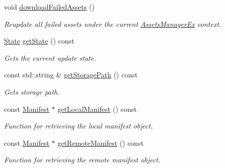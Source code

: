 \begin{DoxyCompactItemize}
void \hyperlink{classAssetsManagerEx_a7e88b604c6cb16e3382ee7126339966c}{download\+Failed\+Assets} ()
\begin{DoxyCompactList}\small\item\em Reupdate all failed assets under the current \hyperlink{classAssetsManagerEx}{Assets\+Manager\+Ex} context. \end{DoxyCompactList}\item 
\mbox{\label{classAssetsManagerEx_aa6514741a6162c3b4978162d3371ac29}} 
\hyperlink{classAssetsManagerEx_a50ac8909632de66eb71eb69fa66229c3}{State} \hyperlink{classAssetsManagerEx_aa6514741a6162c3b4978162d3371ac29}{get\+State} () const
\begin{DoxyCompactList}\small\item\em Gets the current update state. \end{DoxyCompactList}\item 
\mbox{\label{classAssetsManagerEx_ab2517a922a4c51ec42db4e8d518c584d}} 
const std\+::string \& \hyperlink{classAssetsManagerEx_ab2517a922a4c51ec42db4e8d518c584d}{get\+Storage\+Path} () const
\begin{DoxyCompactList}\small\item\em Gets storage path. \end{DoxyCompactList}\item 
\mbox{\label{classAssetsManagerEx_a373a1a9e2db0f78ca60143eb2a37e7d2}} 
const \hyperlink{classManifest}{Manifest} $\ast$ \hyperlink{classAssetsManagerEx_a373a1a9e2db0f78ca60143eb2a37e7d2}{get\+Local\+Manifest} () const
\begin{DoxyCompactList}\small\item\em Function for retrieving the local manifest object. \end{DoxyCompactList}\item 
\mbox{\label{classAssetsManagerEx_a1818b89b0e9370599ce63ba003e74733}} 
const \hyperlink{classManifest}{Manifest} $\ast$ \hyperlink{classAssetsManagerEx_a1818b89b0e9370599ce63ba003e74733}{get\+Remote\+Manifest} () const
\begin{DoxyCompactList}\small\item\em Function for retrieving the remote manifest object. \end{DoxyCompactList}\item 

\end{DoxyCompactItemize}
